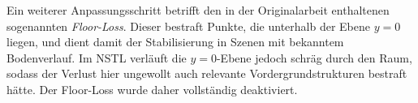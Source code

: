Ein weiterer Anpassungsschritt betrifft den in der Originalarbeit enthaltenen sogenannten \emph{Floor-Loss}. 
Dieser bestraft Punkte, die unterhalb der Ebene $y=0$ liegen, und dient damit der Stabilisierung in Szenen mit bekanntem Bodenverlauf. 
Im NSTL verläuft die $y=0$-Ebene jedoch schräg durch den Raum, sodass der Verlust hier ungewollt auch relevante Vordergrundstrukturen bestraft hätte. 
Der Floor-Loss wurde daher vollständig deaktiviert. 

























